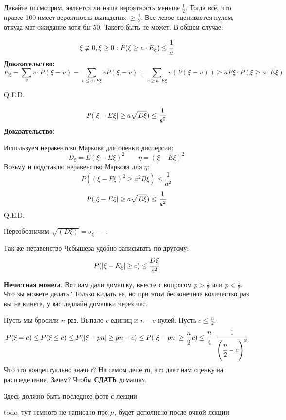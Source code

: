 Давайте посмотрим, является ли наша вероятность меньше $\frac 1 2$. Тогда всё, что правее 100 имеет вероятность выпадения $\geq \frac1 2 $. Все левое оценивается нулем, откуда мат ожидание хотя бы 50. Такого быть не может. В общем случае:

$$\xi\not \equiv0,\xi\geq 0: P(\xi\geq a \cdot E_{\xi}) \leq \cfrac{1}{a}$$
\textbf{Доказательство:}
$$E_{\xi} = \sum\limits_{v}v \cdot P(\xi = v) = \sum\limits_{v \le a \cdot E\xi} v P(\xi = v)+ \sum\limits_{v\geq a\cdot E\xi} v (P(\xi=v))\geq a E{\xi}\cdot P (\xi\geq a\cdot E{\xi})$$

\hfill Q.E.D.

$$P(|\xi-E\xi|\geq a\sqrt{D\xi})\leq \cfrac{1}{a^2}$$
\textbf{Доказательство:}

Используем неравентсво Маркова для оценки дисперсии:
$$D_{\xi} = E(\xi-E\xi)^2\quad \quad  \eta = (\xi-E\xi)^2$$
Возьму и подставлю неравенство Маркова для $\eta$:
$$P((\xi-E\xi)^2\geq a^2D\xi)\leq \dfrac{1}{a^2} $$
$$ P(|\xi-E\xi|\geq a\sqrt{D\xi})\leq \cfrac{1}{a^2}$$
\hfill Q.E.D.


Переобозначим $\sqrt{(D\xi)} = \sigma_{\xi}$ --- .

Так же неравенство Чебышева удобно записывать по-другому:
$$P(|\xi-E_{\xi}|\geq c)\leq \cfrac{D\xi}{c^2}$$


\textbf{Нечестная монета}. Вот вам дали домашку, вместе  с вопросом $p>\frac{1}{2}$ или $p<\frac{1}{2}$. Что вы можете делать? Только кидать ее, но при этом бесконечное количество раз вы не кинете, у вас дедлайн домашки через час. 

Пусть мы бросили $n$ раз. Выпало $c$ единиц и $n-c$ нулей. Пусть $c\le \frac{n}{2}$:
$$P(\xi = c)\leq P(\xi\leq c)\leq P(|\xi-pn|\geq pn-c)\leq  P(|\xi-pn|\geq \frac n 2 c)\leq \cfrac{n}{4}\cdot \cfrac{1}{\left(\cfrac{n}{2}-c\right)^2}$$
Что это концептуально значит? На самом деле то, это дает нам оценку на распределение. Зачем? Чтобы \textbf{\uline{СДАТЬ}} домашку.

Здесь должно быть последнее фото с лекции

todo: тут немного не написано про $\mu$, будет дополнено после очной лекции

